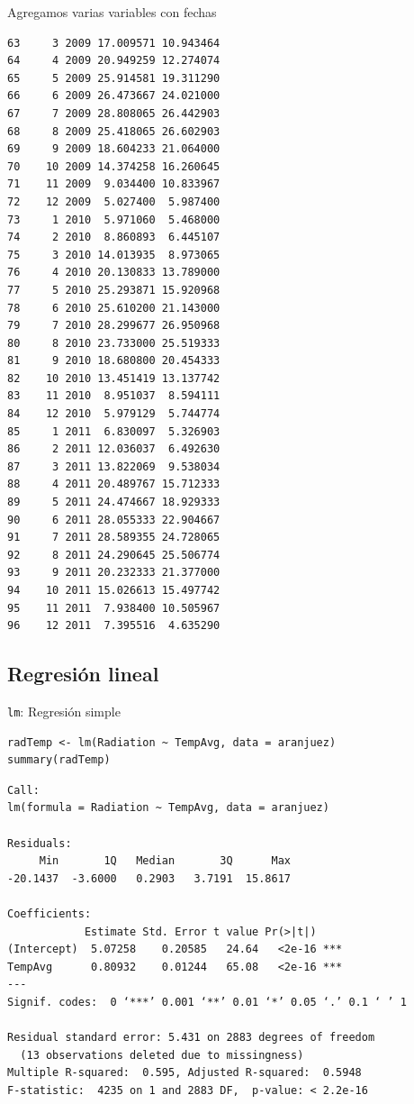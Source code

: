 \documentclass[xcolor={usenames,svgnames,dvipsnames}]{beamer}
\begin{document}
\begin{frame}[fragile,label=sec-5-3-5]{Agregamos varias variables con fechas}
\begin{verbatim}
63     3 2009 17.009571 10.943464
64     4 2009 20.949259 12.274074
65     5 2009 25.914581 19.311290
66     6 2009 26.473667 24.021000
67     7 2009 28.808065 26.442903
68     8 2009 25.418065 26.602903
69     9 2009 18.604233 21.064000
70    10 2009 14.374258 16.260645
71    11 2009  9.034400 10.833967
72    12 2009  5.027400  5.987400
73     1 2010  5.971060  5.468000
74     2 2010  8.860893  6.445107
75     3 2010 14.013935  8.973065
76     4 2010 20.130833 13.789000
77     5 2010 25.293871 15.920968
78     6 2010 25.610200 21.143000
79     7 2010 28.299677 26.950968
80     8 2010 23.733000 25.519333
81     9 2010 18.680800 20.454333
82    10 2010 13.451419 13.137742
83    11 2010  8.951037  8.594111
84    12 2010  5.979129  5.744774
85     1 2011  6.830097  5.326903
86     2 2011 12.036037  6.492630
87     3 2011 13.822069  9.538034
88     4 2011 20.489767 15.712333
89     5 2011 24.474667 18.929333
90     6 2011 28.055333 22.904667
91     7 2011 28.589355 24.728065
92     8 2011 24.290645 25.506774
93     9 2011 20.232333 21.377000
94    10 2011 15.026613 15.497742
95    11 2011  7.938400 10.505967
96    12 2011  7.395516  4.635290
\end{verbatim}
\end{frame}

\subsection{Regresión lineal}
\label{sec-5-4}

\begin{frame}[fragile,label=sec-5-4-1]{\texttt{lm}: Regresión simple}
 \lstset{language=R,label= ,caption= ,numbers=none}
\begin{lstlisting}
radTemp <- lm(Radiation ~ TempAvg, data = aranjuez)
summary(radTemp)
\end{lstlisting}

\begin{verbatim}
Call:
lm(formula = Radiation ~ TempAvg, data = aranjuez)

Residuals:
     Min       1Q   Median       3Q      Max 
-20.1437  -3.6000   0.2903   3.7191  15.8617 

Coefficients:
            Estimate Std. Error t value Pr(>|t|)    
(Intercept)  5.07258    0.20585   24.64   <2e-16 ***
TempAvg      0.80932    0.01244   65.08   <2e-16 ***
---
Signif. codes:  0 ‘***’ 0.001 ‘**’ 0.01 ‘*’ 0.05 ‘.’ 0.1 ‘ ’ 1

Residual standard error: 5.431 on 2883 degrees of freedom
  (13 observations deleted due to missingness)
Multiple R-squared:  0.595,	Adjusted R-squared:  0.5948 
F-statistic:  4235 on 1 and 2883 DF,  p-value: < 2.2e-16
\end{verbatim}
\end{frame}
\end{document}
